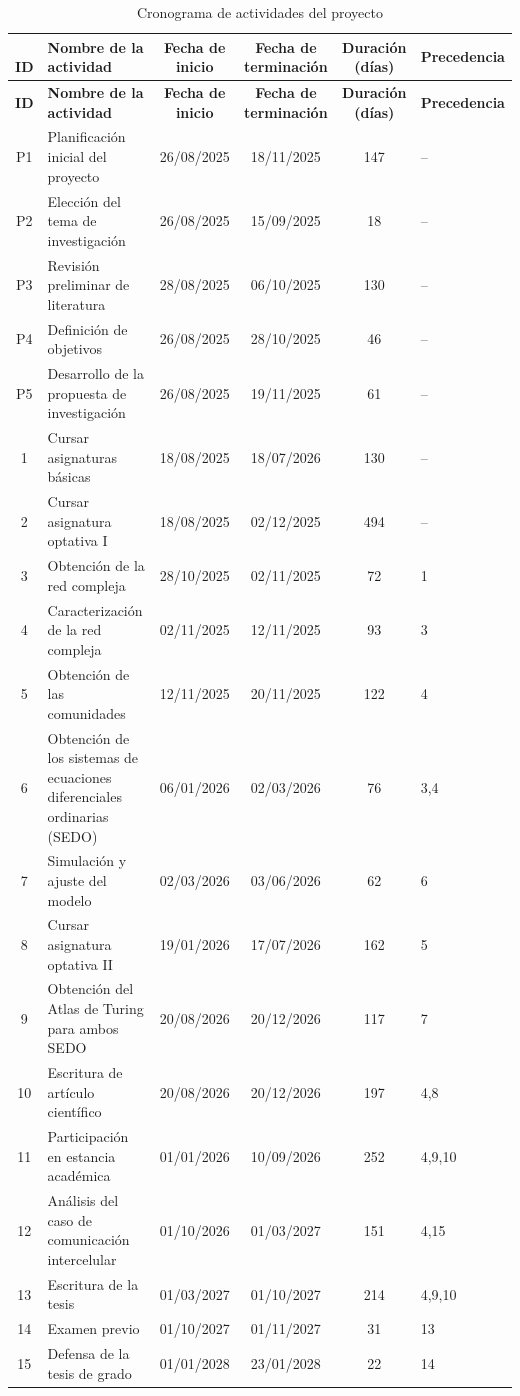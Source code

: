 \documentclass[12pt,spanish]{article}
\begin{document}
	\begin{longtable}{c p{6cm} c c c p{3cm}}
		\caption{Cronograma de actividades del proyecto}\\\
		\toprule
		\textbf{ID} & \textbf{Nombre de la actividad} & \textbf{Fecha de inicio} & \textbf{Fecha de terminación} & \textbf{Duración (días)} & \textbf{Precedencia} \\
		\midrule
		\endfirsthead
		
		\toprule
		\textbf{ID} & \textbf{Nombre de la actividad} & \textbf{Fecha de inicio} & \textbf{Fecha de terminación} & \textbf{Duración (días)} & \textbf{Precedencia} \\
		\midrule
		\endhead
		P1 & Planificación inicial del proyecto & 26/08/2025 & 18/11/2025 & 147 & -- \\
		P2 & Elección del tema de investigación & 26/08/2025 & 15/09/2025 & 18 & -- \\
		P3 & Revisión preliminar de literatura & 28/08/2025 & 06/10/2025 & 130 & -- \\
		P4 & Definición de objetivos & 26/08/2025 & 28/10/2025 & 46 & -- \\
		P5 & Desarrollo de la propuesta de investigación & 26/08/2025 & 19/11/2025 & 61 & -- \\
		\midrule
		1 & Cursar asignaturas básicas & 18/08/2025 & 18/07/2026 & 130 & -- \\
		2 & Cursar asignatura optativa I & 18/08/2025 & 02/12/2025 & 494 & -- \\
		3 & Obtención de la red compleja & 28/10/2025 & 02/11/2025 & 72 & 1 \\
		4 & Caracterización de la red compleja & 02/11/2025 & 12/11/2025 & 93 & 3 \\
		5 & Obtención de las comunidades & 12/11/2025 & 20/11/2025 & 122 & 4 \\
		6 & Obtención de los sistemas de ecuaciones diferenciales ordinarias (SEDO) & 06/01/2026 & 02/03/2026 & 76 & 3,4 \\
		7 & Simulación y ajuste del modelo & 02/03/2026 & 03/06/2026 & 62 & 6 \\
		8 & Cursar asignatura optativa II & 19/01/2026 & 17/07/2026 & 162 & 5 \\
		9 & Obtención del Atlas de Turing para ambos SEDO & 20/08/2026 & 20/12/2026 & 117 & 7 \\
		10 & Escritura de artículo científico & 20/08/2026 & 20/12/2026 & 197 & 4,8 \\
		11 & Participación en estancia académica & 01/01/2026 & 10/09/2026 & 252 & 4,9,10 \\
		12 & Análisis del caso de comunicación intercelular & 01/10/2026 & 01/03/2027 & 151 & 4,15 \\
		13 & Escritura de la tesis & 01/03/2027 & 01/10/2027 & 214 & 4,9,10 \\
		14 & Examen previo & 01/10/2027 & 01/11/2027 & 31 & 13 \\
		15 & Defensa de la tesis de grado & 01/01/2028 & 23/01/2028 & 22 & 14 \\
		\bottomrule
	\end{longtable}
	
\end{document}
